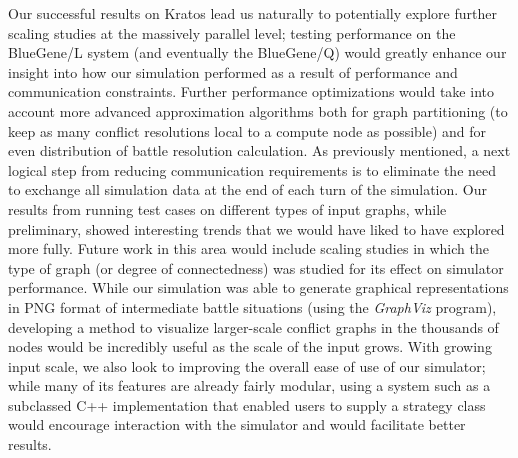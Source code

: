 \documentclass[10pt]{article}
\begin{document}
\begin{multicols}{2}
		Our successful results on Kratos lead us naturally to potentially explore further scaling studies at the massively parallel level; testing performance on the BlueGene/L system (and eventually the BlueGene/Q) would greatly enhance our insight into how our simulation performed as a result of performance and communication constraints.  
		Further performance optimizations would take into account more advanced approximation algorithms both for graph partitioning (to keep as many conflict resolutions local to a compute node as possible) and for even distribution of battle resolution calculation.  
		As previously mentioned, a next logical step from reducing communication requirements is to eliminate the need to exchange all simulation data at the end of each turn of the simulation.  
		Our results from running test cases on different types of input graphs, while preliminary, showed interesting trends that we would have liked to have explored more fully.  
		Future work in this area would include scaling studies in which the type of graph (or degree of connectedness) was studied for its effect on simulator performance.
		While our simulation was able to generate graphical representations in PNG format of intermediate battle situations (using the \emph{GraphViz} program), developing a method to visualize larger-scale conflict graphs in the thousands of nodes would be incredibly useful as the scale of the input grows.  
		With growing input scale, we also look to improving the overall ease of use of our simulator; while many of its features are already fairly modular, using a system such as a subclassed C++ implementation that enabled users to supply a strategy class would encourage interaction with the simulator and would facilitate better results. 

	\end{multicols}
\end{document}
